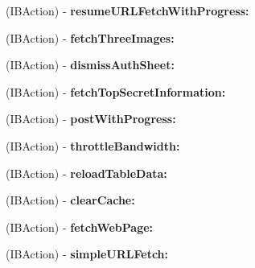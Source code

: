 \begin{DoxyCompactItemize}
\item 
\hypertarget{interface_app_delegate_a2cade9ac0202476ed05e61f80bf264d7}{
(\-I\-B\-Action) -\/ {\bfseries resume\-U\-R\-L\-Fetch\-With\-Progress\-:}}
\label{interface_app_delegate_a2cade9ac0202476ed05e61f80bf264d7}

\item 
\hypertarget{interface_app_delegate_ac4539e36ee04667d57b2c8e04d86ab2b}{
(\-I\-B\-Action) -\/ {\bfseries fetch\-Three\-Images\-:}}
\label{interface_app_delegate_ac4539e36ee04667d57b2c8e04d86ab2b}

\item 
\hypertarget{interface_app_delegate_a58df587c5185342c391c88891df13914}{
(\-I\-B\-Action) -\/ {\bfseries dismiss\-Auth\-Sheet\-:}}
\label{interface_app_delegate_a58df587c5185342c391c88891df13914}

\item 
\hypertarget{interface_app_delegate_ac5d049cda6ea4cca2ea549a7401bda67}{
(\-I\-B\-Action) -\/ {\bfseries fetch\-Top\-Secret\-Information\-:}}
\label{interface_app_delegate_ac5d049cda6ea4cca2ea549a7401bda67}

\item 
\hypertarget{interface_app_delegate_a4d9bbab2eacd4f9218efa3727fbd02bf}{
(\-I\-B\-Action) -\/ {\bfseries post\-With\-Progress\-:}}
\label{interface_app_delegate_a4d9bbab2eacd4f9218efa3727fbd02bf}

\item 
\hypertarget{interface_app_delegate_ae80de33af1d53d57d24dfa85ea56d543}{
(\-I\-B\-Action) -\/ {\bfseries throttle\-Bandwidth\-:}}
\label{interface_app_delegate_ae80de33af1d53d57d24dfa85ea56d543}

\item 
\hypertarget{interface_app_delegate_a54f614d323c51ccc4b9f481ddce8ff77}{
(\-I\-B\-Action) -\/ {\bfseries reload\-Table\-Data\-:}}
\label{interface_app_delegate_a54f614d323c51ccc4b9f481ddce8ff77}

\item 
\hypertarget{interface_app_delegate_ac380181c5d1e01d047ed5937d615f3b6}{
(\-I\-B\-Action) -\/ {\bfseries clear\-Cache\-:}}
\label{interface_app_delegate_ac380181c5d1e01d047ed5937d615f3b6}

\item 
\hypertarget{interface_app_delegate_a70ac16ace7467246814859f19b0fc65c}{
(\-I\-B\-Action) -\/ {\bfseries fetch\-Web\-Page\-:}}
\label{interface_app_delegate_a70ac16ace7467246814859f19b0fc65c}

\item 
\hypertarget{interface_app_delegate_aed8bd6c24d0a5ea30b1c339eaae5386f}{
(\-I\-B\-Action) -\/ {\bfseries simple\-U\-R\-L\-Fetch\-:}}
\label{interface_app_delegate_aed8bd6c24d0a5ea30b1c339eaae5386f}


\end{DoxyCompactItemize}
